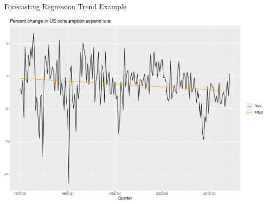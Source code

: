 \documentclass[
  ignorenonframetext,
]{beamer}
\begin{document}
\begin{frame}{Forecasting \textbar{} \small Regression Trend Example}
\protect\hypertarget{forecasting-regression-trend-example-3}{}
\footnotesize

\includegraphics{Time-series-regression-models_files/figure-beamer/unnamed-chunk-36-1.pdf}

\normalfont
\end{frame}
\end{document}

